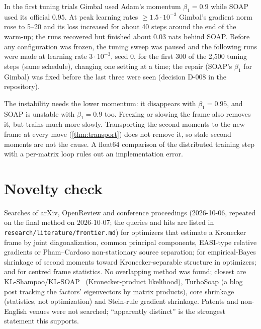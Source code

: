 In the first tuning trials Gimbal used Adam's momentum $\beta_1=0.9$ while SOAP used its official
$0.95$. At peak learning rates $\ge1.5\cdot10^{-3}$ Gimbal's gradient norm rose to 5--20 and its loss
increased for about 40 steps around the end of the warm-up; the runs recovered but finished about
0.03 nats behind SOAP. Before any configuration was frozen, the tuning sweep was paused and the
following runs were made at learning rate $3\cdot10^{-3}$, seed 0, for the first 300 of the 2{,}500
tuning steps (same schedule), changing one setting at a time; the repair (SOAP's $\beta_1$ for
Gimbal) was fixed before the last three were seen (decision D-008 in the repository).

\begin{center}\small

\end{center}

The instability needs the lower momentum: it disappears with $\beta_1=0.95$, and SOAP is unstable
with $\beta_1=0.9$ too. Freezing or slowing the frame also removes it, but trains much more slowly.
Transporting the second moments to the new frame at every move (\cref{thm:transport}) does not
remove it, so stale second moments are not the cause. A float64 comparison of the distributed
training step with a per-matrix loop rules out an implementation error.

\section{Novelty check}
\label{app:novelty}

Searches of arXiv, OpenReview and conference proceedings (2026-10-06, repeated on the final
method on 2026-10-07; the queries and hits are listed in \texttt{research/literature/frontier.md}) for optimizers that estimate a Kronecker frame
by joint diagonalization, common principal components, EASI-type relative gradients or
Pham--Cardoso non-stationary source separation; for empirical-Bayes shrinkage of second moments
toward Kronecker-separable structure in optimizers; and for centred frame statistics. No overlapping
method was found; closest are KL-Shampoo/KL-SOAP~\citep{lin2025klshampoo} (Kronecker-product
likelihood), TurboSoap (a blog post tracking the factors' eigenvectors by matrix products), core
shrinkage~\citep{hoff2023core} (statistics, not optimization) and Stein-rule gradient shrinkage.
Patents and non-English venues were not searched; ``apparently distinct'' is the strongest
statement this supports.

